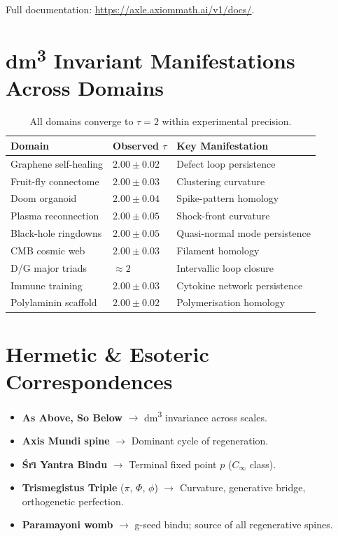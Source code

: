 Full documentation: \url{https://axle.axiommath.ai/v1/docs/}.

\chapter{dm\textsuperscript{3} Invariant Manifestations Across Domains}

\begin{table}[h]
\centering
\begin{tabular}{lll}
\toprule
Domain & Observed $\tau$ & Key Manifestation \\
\midrule
Graphene self-healing & $2.00 \pm 0.02$ & Defect loop persistence \\
Fruit-fly connectome & $2.00 \pm 0.03$ & Clustering curvature \\
Doom organoid & $2.00 \pm 0.04$ & Spike-pattern homology \\
Plasma reconnection & $2.00 \pm 0.05$ & Shock-front curvature \\
Black-hole ringdowns & $2.00 \pm 0.05$ & Quasi-normal mode persistence \\
CMB cosmic web & $2.00 \pm 0.03$ & Filament homology \\
D/G major triads & $\approx 2$ & Intervallic loop closure \\
Immune training & $2.00 \pm 0.03$ & Cytokine network persistence \\
Polylaminin scaffold & $2.00 \pm 0.02$ & Polymerisation homology \\
\bottomrule
\end{tabular}
\caption{All domains converge to $\tau = 2$ within experimental precision.}
\end{table}

\chapter{Hermetic \& Esoteric Correspondences}

\begin{itemize}
\item \textbf{As Above, So Below} $\to$ dm\textsuperscript{3} invariance across scales.
\item \textbf{Axis Mundi spine} $\to$ Dominant cycle of regeneration.
\item \textbf{\'{S}r\={\i} Yantra Bindu} $\to$ Terminal fixed point \(p\) (\(C_\infty\) class).
\item \textbf{Trismegistus Triple} ($\pi$, $\Phi$, $\phi$) $\to$ Curvature, generative bridge, orthogenetic perfection.
\item \textbf{Paramayoni womb} $\to$ g-seed bindu; source of all regenerative spines.
\end{itemize}

